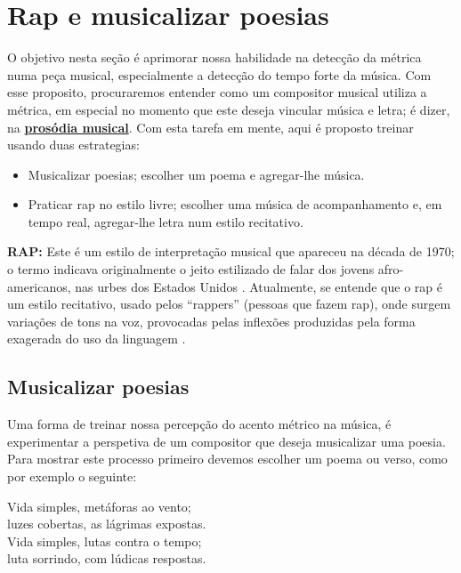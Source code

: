 
\section{Rap e musicalizar poesias}

O objetivo nesta seção é aprimorar nossa habilidade na detecção da métrica numa peça musical,
especialmente a detecção do tempo forte da música.
Com esse proposito, procuraremos entender como um compositor musical utiliza a métrica,
em especial no momento que este deseja vincular música e letra;
é dizer, na \hyperref[sec:ProsodiaMusical]{\textbf{prosódia musical}}. 
Com esta tarefa em mente, aqui é proposto treinar usando duas estrategias:
\begin{itemize}
\item Musicalizar poesias; escolher um poema e agregar-lhe música.
\item Praticar rap no estilo livre; escolher uma música de acompanhamento e, em tempo real, 
 agregar-lhe letra num estilo recitativo.
\end{itemize}


\begin{tcbinformation} 
\textbf{RAP:}
\label{ref:RAP}
 Este é um estilo de interpretação musical que apareceu na década de 1970;
o termo indicava originalmente o jeito estilizado de falar dos jovens afro-americanos, 
nas urbes dos Estados Unidos  \cite[pp. 1250]{latham2008diccionario}.
Atualmente, se entende que o rap é um estilo recitativo,
usado pelos ``rappers'' (pessoas que fazem rap),
onde surgem variações de tons na voz, 
provocadas pelas inflexões produzidas pela forma exagerada do uso da linguagem \cite[pp. 1250]{latham2008diccionario}.
\end{tcbinformation} 


\subsection{Musicalizar poesias}
\label{subsec:musicalizarpoesias}
Uma forma de treinar nossa percepção do acento métrico na música, 
é experimentar a perspetiva de um compositor que deseja musicalizar uma poesia.
Para mostrar este processo primeiro devemos escolher um poema ou verso,
como por exemplo o seguinte:

\begin{citando}
Vida simples, metáforas ao vento;\\
luzes cobertas, as lágrimas expostas.\\
Vida simples, lutas contra o tempo;\\
luta sorrindo, com lúdicas respostas.
\end{citando}

